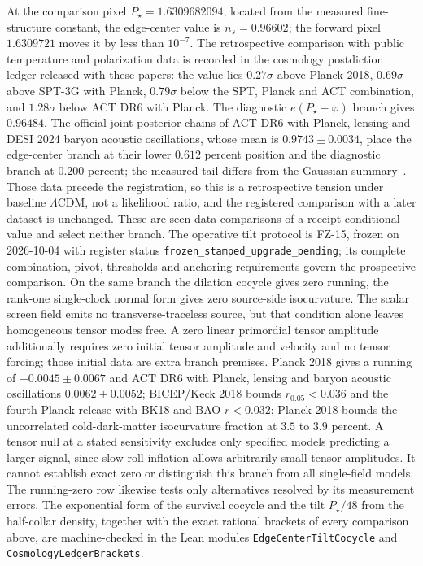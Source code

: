 \documentclass[11pt]{article}
\theoremstyle{remark}
\theoremstyle{plain}
\begin{document}
At the comparison pixel \(P_\star=1.6309682094\), located from the measured
fine-structure constant, the edge-center value is \(n_s=0.96602\); the forward
pixel \(1.6309721\) moves it by less than \(10^{-7}\). The retrospective
comparison with public temperature and polarization data is recorded in the
cosmology postdiction ledger released with these papers: the value lies
\(0.27\sigma\) above Planck 2018, \(0.69\sigma\) above SPT-3G with Planck,
\(0.79\sigma\) below the SPT, Planck and ACT combination, and \(1.28\sigma\)
below ACT DR6 with Planck.
The diagnostic \(e(P_\star-\varphi)\) branch gives \(0.96484\).
The official joint posterior chains of ACT DR6 with Planck, lensing and DESI
2024 baryon acoustic oscillations, whose mean is \(0.9743\pm0.0034\), place
the edge-center branch at their lower \(0.612\) percent position and the
diagnostic branch at \(0.200\) percent; the measured tail differs from the
Gaussian summary~\cite{act2025,ophpublicdata}. Those data precede the
registration, so this is a retrospective tension under baseline
\(\Lambda\)CDM, not a likelihood ratio, and the registered comparison with a
later dataset is unchanged. These are seen-data comparisons of a
receipt-conditional value and select neither branch. The operative tilt protocol is FZ-15,
frozen on 2026-10-04 with register status
\texttt{frozen\_stamped\_upgrade\_pending}; its complete combination, pivot,
thresholds and anchoring requirements govern the prospective comparison.
On the same branch
the dilation cocycle gives zero running,
the rank-one single-clock normal form gives zero source-side isocurvature.
The scalar screen field emits no transverse-traceless source,
but that condition alone leaves homogeneous tensor modes free.
A zero linear primordial tensor amplitude additionally requires zero initial tensor amplitude and velocity and no tensor forcing;
those initial data are extra branch premises. Planck 2018 gives a
running of \(-0.0045\pm0.0067\) and ACT DR6 with Planck, lensing and
baryon acoustic oscillations \(0.0062\pm0.0052\); BICEP/Keck 2018 bounds
\(r_{0.05}<0.036\) and the fourth Planck release with BK18 and BAO \(r<0.032\); Planck
2018 bounds the uncorrelated cold-dark-matter isocurvature fraction at
\(3.5\) to \(3.9\) percent. A tensor null at a stated sensitivity excludes
only specified models predicting a larger signal, since slow-roll inflation
allows arbitrarily small tensor amplitudes. It cannot establish exact zero
or distinguish this branch from all single-field models. The running-zero
row likewise tests only alternatives resolved by its measurement errors.
The exponential form of the survival cocycle and the tilt
\(P_\star/48\) from the half-collar density, together with the exact
rational brackets of every comparison above, are machine-checked in the
Lean modules \texttt{EdgeCenterTiltCocycle} and
\texttt{CosmologyLedgerBrackets}.
\end{document}
